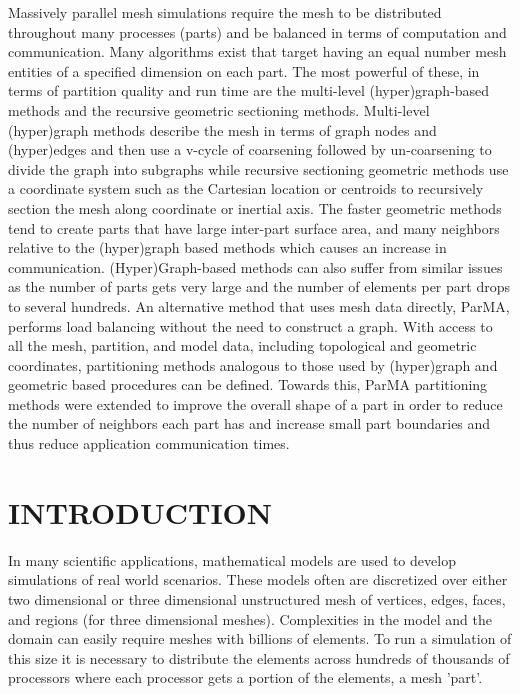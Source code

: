 \documentclass{thesis}
\author{Gerrett Diamond}
\begin{document}
 
\titlepage             %
\tableofcontents       %

Massively parallel mesh simulations require the mesh to be distributed
throughout many processes (parts) and be balanced in terms of computation and
communication. 
Many algorithms exist that target having an equal number mesh entities of a
specified dimension on each part. 
The most powerful of these, in terms of partition quality and run time are the
multi-level (hyper)graph-based methods and the recursive geometric sectioning
methods. 
Multi-level (hyper)graph methods describe the mesh in terms of graph nodes and
(hyper)edges and then use a v-cycle of coarsening followed by un-coarsening to
divide the graph into subgraphs while recursive sectioning geometric methods use
a coordinate system such as the Cartesian location or centroids to recursively
section the mesh along coordinate or inertial axis. 
The faster geometric methods tend to create parts that have large inter-part
surface area, and many neighbors relative to the (hyper)graph based methods
which causes an increase in communication.
(Hyper)Graph-based methods can also suffer from similar issues as the number of
parts gets very large and the number of elements per part drops to several
hundreds. 
An alternative method that uses mesh data directly, ParMA, performs load 
balancing without the need to construct a graph. 
With access to all the mesh, partition, and model data, including topological 
and geometric coordinates, partitioning methods analogous to those used by 
(hyper)graph and geometric based procedures can be defined.
Towards this, ParMA partitioning methods were extended to improve the 
overall shape of a part in order to reduce the number of neighbors each part 
has and increase small part boundaries and thus reduce application 
communication times.

\newpage

\begingroup
\let\clearpage\relax

\chapter{INTRODUCTION}

In many scientific applications, mathematical models are used to develop 
simulations of real world scenarios. These models often are discretized over
either two dimensional or three dimensional unstructured mesh of vertices, 
edges, 
faces, and regions (for three dimensional meshes).  Complexities in the model 
and the domain can easily require meshes with billions of elements.
To run a simulation of this size it is necessary to distribute the elements 
across hundreds of thousands of processors where each processor gets a portion 
of the elements, a mesh 'part'.
\end{document}

